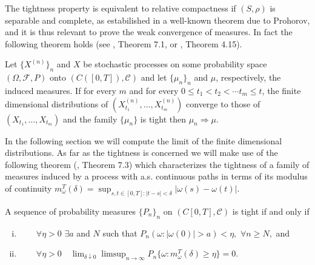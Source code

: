The tightness property  is equivalent to  relative compactness if $ (S, \rho) $ is separable and complete,
as estabilished in a well-known theorem due to Prohorov, and it is thus relevant to prove the weak convergence of measures. 
In fact the following theorem holds (see \cite{billingsley2009convergence}, Theorem 7.1, or \cite{karatzas2014brownian}, Theorem 4.15).
%
%
%
\begin{theorem}\label{thm:weak-conv}
	Let $ \{ X^{(n)} \}_n $ and $ X $ be stochastic processes on some probability space $ (\Omega, \mathscr F, P) $ onto $(C([0,T]), \mathscr C )$ and let $ \{\mu_n \}_n $ and $ \mu $, respectively, the induced measures. 
	If for every $ m $ and for every $ 0 \leq t_1 < t_2 < \cdots t_m \leq t $, 
	the finite dimensional distributions of $ (X^{(n)}_{t_1}, \ldots, X^{(n)}_{t_m} ) $ converge 
	to those of $ (X_{t_1}, \ldots, X_{t_m} ) $ and the family $ \{\mu_n\}  $ is tight then $ \mu_n \Rightarrow \mu $.
\end{theorem}
%
%
%
In the following section we will compute the limit of the finite dimensional distributions. 
As far as the tightness is concerned we will make use of the following theorem 
(\cite{billingsley2009convergence}, Theorem 7.3)
which characterizes the tightness
of a family of measures induced by a process with a.s. continuous paths 
in terms of its modulus of continuity $ m_\omega^T (\delta) = \sup_{s,t \in [0,T]: |t-s| < \delta} |\omega(s) - \omega(t)| $.

\begin{theorem}\label{thm:tight}
	A sequence of probability measures $ \{P_n\}_n $ on $ (C[0,T], \mathscr C) $ is tight if and only if
	\begin{enumerate}[(i)]
		\item  $ \qquad  \forall \eta > 0 \,\,  \exists a  $ and $  N $ such that 
		$ \displaystyle P_n(\omega :  |\omega(0)| > a  )  < \eta, \,\, \forall n \geq  N ,  $ and 
		\item  $ \qquad  \displaystyle \forall \eta > 0 \quad  
		 \lim_{\delta \downarrow 0} \limsup_{n \to \infty } P_n\{ \omega: m_\omega^T ( \delta) \geq \eta   \} = 0.
		$	
	\end{enumerate}
\end{theorem}
%
%
%


